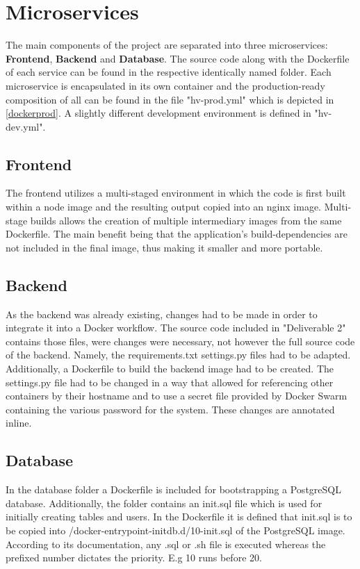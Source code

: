 \section{Microservices}
The main components of the project are separated into three microservices: \textbf{Frontend}, \textbf{Backend} and \textbf{Database}. The source code along with the Dockerfile of each service can be found in the respective identically named folder. Each microservice is encapsulated in its own container and the production-ready composition of all can be found in the file "hv-prod.yml" which is depicted in \autoref{dockerprod}. A slightly different development environment is defined in "hv-dev.yml".

\subsection{Frontend}
The frontend utilizes a multi-staged environment in which the code is first built within a node image and the resulting output copied into an nginx image. Multi-stage builds allows the creation of multiple intermediary images from the same Dockerfile. The main benefit being that the application's build-dependencies are not included in the final image, thus making it smaller and more portable. 

\subsection{Backend}
As the backend was already existing, changes had to be made in order to integrate it into a Docker workflow. The source code included in "Deliverable 2" contains those files, were changes were necessary, not however the full source code of the backend. Namely, the requirements.txt settings.py files had to be adapted. Additionally, a Dockerfile to build the backend image had to be created. The settings.py file had to be changed in a way that allowed for referencing other containers by their hostname and to use a secret file provided by Docker Swarm containing the various password for the system. These changes are annotated inline.

\subsection{Database}
In the database folder a Dockerfile is included for bootstrapping a PostgreSQL database. Additionally, the folder contains an init.sql file which is used for initially creating tables and users. In the Dockerfile it is defined that init.sql is to be copied into /docker-entrypoint-initdb.d/10-init.sql of the PostgreSQL image. According to its documentation, any .sql or .sh file is executed whereas the prefixed number dictates the priority. E.g 10 runs before 20.

